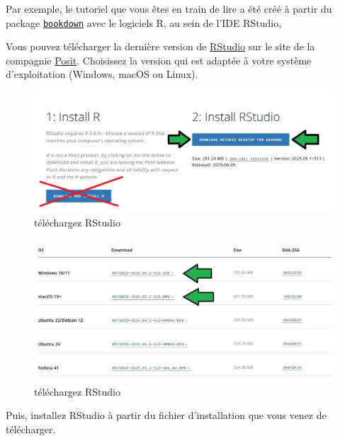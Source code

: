 \documentclass[
]{book}
\begin{document}
Par exemple, le tutoriel que vous êtes en train de lire a été créé à partir du package \href{https://bookdown.org/}{\texttt{bookdown}} avec le logiciels R, au sein de l'IDE RStudio,

Vous pouvez télécharger la dernière version de \href{https://posit.co/download/rstudio-desktop/}{RStudio} sur le site de la compagnie \href{https://posit.co/products/open-source/rstudio/?sid=1}{Posit}. Choisissez la version qui est adaptée à votre système d'exploitation (Windows, macOS ou Linux).

\begin{figure}

{\centering \includegraphics[width=1\linewidth]{./images/telecharger_RStudio_1} 

}

\caption{téléchargez RStudio}\label{fig:dlRStudio-1}
\end{figure}
\begin{figure}

{\centering \includegraphics[width=1\linewidth]{./images/telecharger_RStudio_2} 

}

\caption{téléchargez RStudio}\label{fig:dlRStudio-2}
\end{figure}

Puis, installez RStudio à partir du fichier d'installation que vous venez de télécharger.
\end{document}
